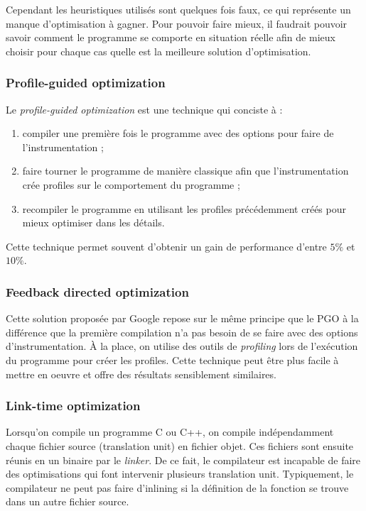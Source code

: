 \documentclass[a4paper]{report}
\begin{document}
Cependant les heuristiques utilisés sont quelques fois faux, ce qui représente un manque d'optimisation à gagner.
Pour pouvoir faire mieux, il faudrait pouvoir savoir comment le programme se comporte en situation réelle afin de mieux choisir pour chaque cas quelle est la meilleure solution d'optimisation.

\subsubsection{Profile-guided optimization}
Le \emph{profile-guided optimization} est une technique qui conciste à :
\begin{enumerate}
    \item compiler une première fois le programme avec des options pour faire de l'instrumentation ;
    \item faire tourner le programme de manière classique afin que l'instrumentation crée profiles sur le comportement du programme ;
    \item recompiler le programme en utilisant les profiles précédemment créés pour mieux optimiser dans les détails.
\end{enumerate}
Cette technique permet souvent d'obtenir un gain de performance d'entre $5\%$ et $10\%$.

\subsubsection{Feedback directed optimization}
Cette solution proposée par Google repose sur le même principe que le PGO à la différence que la première compilation n'a pas besoin de se faire avec des options d'instrumentation.
À la place, on utilise des outils de \emph{profiling} lors de l'exécution du programme pour créer les profiles.
Cette technique peut être plus facile à mettre en oeuvre et offre des résultats sensiblement similaires.

\subsubsection{Link-time optimization}
Lorsqu'on compile un programme C ou C++, on compile indépendamment chaque fichier source (translation unit) en fichier objet.
Ces fichiers sont ensuite réunis en un binaire par le \emph{linker}.
De ce fait, le compilateur est incapable de faire des optimisations qui font intervenir plusieurs translation unit.
Typiquement, le compilateur ne peut pas faire d'inlining si la définition de la fonction se trouve dans un autre fichier source.
\end{document}
